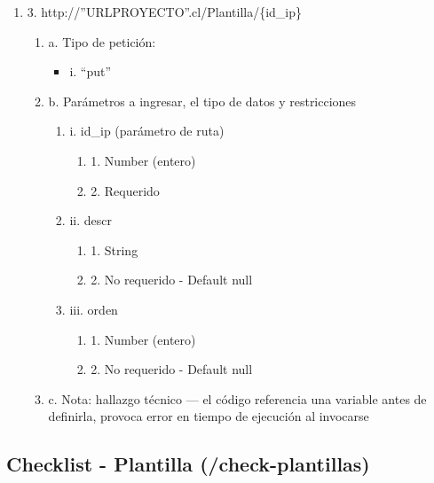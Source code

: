 \begin{enumerate}
    \item 3. http://”URLPROYECTO”.cl/Plantilla/\{id\_ip\}
    \begin{enumerate}
        \item a. Tipo de petición:
            \begin{itemize}
               \item i. “put”
            \end{itemize}
        \item b. Parámetros a ingresar, el tipo de datos y restricciones
            \begin{enumerate}
                \item i. id\_ip (parámetro de ruta)
                    \begin{enumerate}
                        \item 1. Number (entero)
                        \item 2. Requerido
                    \end{enumerate}
                \item ii. descr
                    \begin{enumerate}
                        \item 1. String
                        \item 2. No requerido - Default null
                    \end{enumerate}
                \item iii. orden
                    \begin{enumerate}
                        \item 1. Number (entero)
                        \item 2. No requerido - Default null
                    \end{enumerate}
            \end{enumerate}
        \item c. Nota: hallazgo técnico — el código referencia una variable antes de definirla, provoca error en tiempo de ejecución al invocarse
    \end{enumerate}
\end{enumerate}

\subsection{Checklist - Plantilla (/check-plantillas)}

